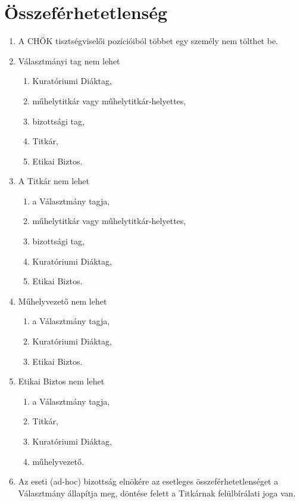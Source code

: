 \documentclass{../styles/rulebook}
\begin{document}
\section{Összeférhetetlenség}

\begin{enumerate}
	\item A CHÖK tisztségviselői pozícióiból többet egy személy nem tölthet be.
    \item Választmányi tag nem lehet
	\begin{enumerate}
		\item Kuratóriumi Diáktag,
        \item műhelytitkár vagy műhelytitkár-helyettes,
        \item bizottsági tag,
        \item Titkár,
        \item Etikai Biztos.
	\end{enumerate}
	\item A Titkár nem lehet
	\begin{enumerate}
        \item a Választmány tagja,
        \item műhelytitkár vagy műhelytitkár-helyettes,
        \item bizottsági tag,
        \item Kuratóriumi Diáktag,
        \item Etikai Biztos.
	\end{enumerate}
	\item Műhelyvezető nem lehet 
	\begin{enumerate}
        \item a Választmány tagja,
        \item Kuratóriumi Diáktag,
        \item Etikai Biztos.
	\end{enumerate}
	\item Etikai Biztos nem lehet
	\begin{enumerate}
        \item a Választmány tagja,
        \item Titkár,
        \item Kuratóriumi Diáktag,
        \item műhelyvezető.
	\end{enumerate}
    \item Az eseti (ad-hoc) bizottság elnökére az esetleges összeférhetetlenséget a Választmány állapítja meg, döntése felett a Titkárnak felülbírálati joga van.
\end{enumerate}
\end{document}
